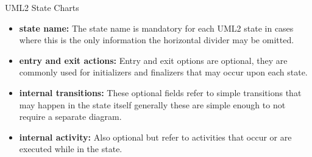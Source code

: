 \begin{definition}
UML2 State Charts

\label{def:uml2}
\begin{itemize}
	\item \textbf{state name:} The state name is mandatory for each UML2 state in cases where this is the only information the horizontal divider may be omitted.
	\item \textbf{entry and exit actions:} Entry and exit options are optional, they are commonly used for initializers and finalizers that may occur upon each state.
	\item \textbf{internal transitions:} These optional fields refer to simple transitions that may happen in the state itself generally these are simple enough to not require a separate diagram.
	\item \textbf{internal activity:} Also optional but refer to activities that occur or are executed while in the state.
\end{itemize}
\end{definition}

